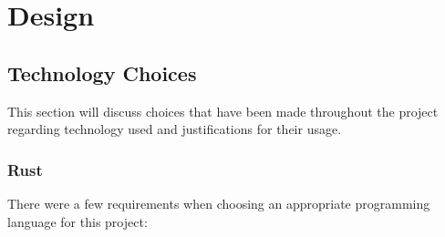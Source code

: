 \chapter{Design} \label{cha:design}
\section{Technology Choices} \label{sec:chapdesign:technology}
This section will discuss choices that have been made throughout the project regarding technology used and justifications for their usage.

\subsection{Rust} \label{sec:chapdesign:technology:rust}
There were a few requirements when choosing an appropriate programming language for this project:

